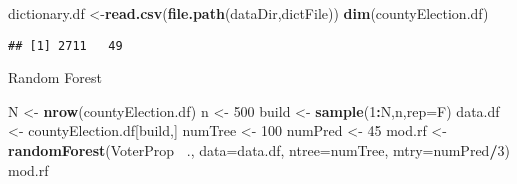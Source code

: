 \documentclass[]{article}
\newenvironment{Shaded}{\begin{snugshade}}{\end{snugshade}}
\newcommand{\DataTypeTok}[1]{\textcolor[rgb]{0.13,0.29,0.53}{#1}}
\newcommand{\DecValTok}[1]{\textcolor[rgb]{0.00,0.00,0.81}{#1}}
\newcommand{\KeywordTok}[1]{\textcolor[rgb]{0.13,0.29,0.53}{\textbf{#1}}}
\newcommand{\NormalTok}[1]{#1}
\newcommand{\OperatorTok}[1]{\textcolor[rgb]{0.81,0.36,0.00}{\textbf{#1}}}
\newcommand{\StringTok}[1]{\textcolor[rgb]{0.31,0.60,0.02}{#1}}
\begin{document}
\begin{Shaded}
\begin{Highlighting}[]
\NormalTok{dictionary.df <-}\KeywordTok{read.csv}\NormalTok{(}\KeywordTok{file.path}\NormalTok{(dataDir,dictFile))}
\KeywordTok{dim}\NormalTok{(countyElection.df)}
\end{Highlighting}
\end{Shaded}

\begin{verbatim}
## [1] 2711   49
\end{verbatim}

\begin{Shaded}
\end{Shaded}

Random Forest

\begin{Shaded}
\begin{Highlighting}[]
\NormalTok{N <-}\StringTok{ }\KeywordTok{nrow}\NormalTok{(countyElection.df)}
\NormalTok{n <-}\StringTok{ }\DecValTok{500}
\NormalTok{build <-}\StringTok{ }\KeywordTok{sample}\NormalTok{(}\DecValTok{1}\OperatorTok{:}\NormalTok{N,n,}\DataTypeTok{rep=}\NormalTok{F) }
\NormalTok{data.df <-}\StringTok{ }\NormalTok{countyElection.df[build,]}
\NormalTok{numTree <-}\StringTok{ }\DecValTok{100}
\NormalTok{numPred <-}\StringTok{ }\DecValTok{45}
\NormalTok{mod.rf <-}\StringTok{ }\KeywordTok{randomForest}\NormalTok{(VoterProp }\OperatorTok{~}\NormalTok{.,}
                        \DataTypeTok{data=}\NormalTok{data.df, }
                        \DataTypeTok{ntree=}\NormalTok{numTree, }
                        \DataTypeTok{mtry=}\NormalTok{numPred}\OperatorTok{/}\DecValTok{3}\NormalTok{)}
\NormalTok{mod.rf}
\end{Highlighting}
\end{Shaded}
\end{document}
